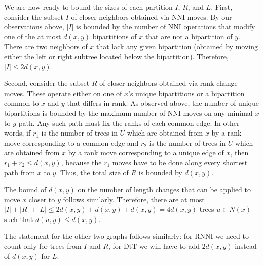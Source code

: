 \documentclass[11pt]{amsart}
\theoremstyle{definition}
\newcommand{\nni}{\mathrm{NNI}}
\newcommand{\rnni}{\mathrm{RNNI}}
\newcommand{\dtt}{\mathrm{DtT}}
\begin{document}
We are now ready to bound the sizes of each partition $I$, $R$, and $L$.
First, consider the subset $I$ of closer neighbors obtained via $\nni$ moves.
By our observations above, $|I|$ is bounded by the number of $\nni$ operations that modify one of the at most $d(x,y)$ bipartitions of $x$ that are not a bipartition of $y$.
There are two neighbors of $x$ that lack any given bipartition (obtained by moving either the left or right subtree located below the bipartition).
Therefore, $|I| \le 2d(x,y)$.

Second, consider the subset $R$ of closer neighbors obtained via rank change moves.
These operate either on one of $x$'s unique bipartitions or a bipartition common to $x$ and $y$ that differs in rank.
As observed above, the number of unique bipartitions is bounded by the maximum number of $\nni$ moves on any minimal $x$ to $y$ path.
Any such path must fix the ranks of each common edge.
In other words, if $r_1$ is the number of trees in $U$ which are obtained from $x$ by a rank move corresponding to a common edge and $r_2$ is the number of trees in $U$ which are obtained from $x$ by a rank move corresponding to a unique edge of $x$, then $r_1 + r_2 \leq d(x,y)$, because the $r_1$ moves have to be done along every shortest path from $x$ to $y$.
Thus, the total size of $R$ is bounded by $d(x,y)$.

The bound of $d(x,y)$ on the number of length changes that can be applied to move $x$ closer to $y$ follows similarly.
Therefore, there are at most $|I| + |R| + |L| \le 2d(x,y) + d(x,y) + d(x,y) = 4d(x,y)$ trees $u \in N(x)$ such that $d(u, y) \le d(x, y)$.

The statement for the other two graphs follows similarly: for $\rnni$ we need to count only for trees from $I$ and $R$, for $\dtt$ we will have to add $2d(x,y)$ instead of $d(x,y)$ for $L$.
\endproof


\printbibliography
\end{document}
